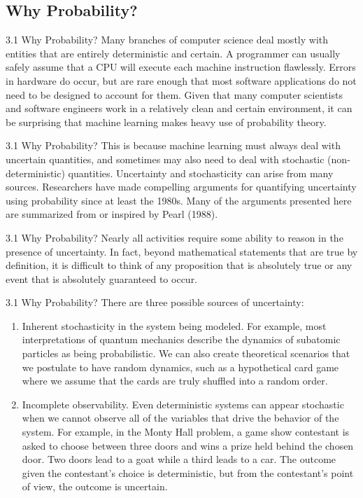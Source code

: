\subsection{Why Probability?}
\begin{frame}{3.1 Why Probability?}
    \justifying
    Many branches of computer science deal mostly with entities that are entirely deterministic and certain. A programmer can usually safely assume that a CPU will execute each machine instruction flawlessly. Errors in hardware do occur, but are rare enough that most software applications do not need to be designed to account for them. Given that many computer scientists and software engineers work in a relatively clean and certain environment, it can be surprising that machine learning makes heavy use of probability theory.
\end{frame}

\begin{frame}{3.1 Why Probability?}
    \justifying
    This is because machine learning must always deal with uncertain quantities, and sometimes may also need to deal with stochastic (non-deterministic) quantities. Uncertainty and stochasticity can arise from many sources. Researchers have made compelling arguments for quantifying uncertainty using probability since at least the 1980s. Many of the arguments presented here are summarized from or inspired by Pearl (1988).
\end{frame}

\begin{frame}{3.1 Why Probability?}
    \justifying
    Nearly all activities require some ability to reason in the presence of uncertainty. In fact, beyond mathematical statements that are true by definition, it is difficult to think of any proposition that is absolutely true or any event that is absolutely guaranteed to occur.
\end{frame}

\begin{frame}{3.1 Why Probability?}
    \justifying
    There are three possible sources of uncertainty:
    \begin{enumerate}
    \justifying
        \item Inherent stochasticity in the system being modeled. For example, most interpretations of quantum mechanics describe the dynamics of subatomic particles as being probabilistic. We can also create theoretical scenarios that we postulate to have random dynamics, such as a hypothetical card game where we assume that the cards are truly shuffled into a random order.
        \item Incomplete observability. Even deterministic systems can appear stochastic when we cannot observe all of the variables that drive the behavior of the system. For example, in the Monty Hall problem, a game show contestant is asked to choose between three doors and wins a prize held behind the chosen door. Two doors lead to a goat while a third leads to a car. The outcome given the contestant’s choice is deterministic, but from the contestant’s point of view, the outcome is uncertain.
        \seti
    \end{enumerate}
\end{frame}

